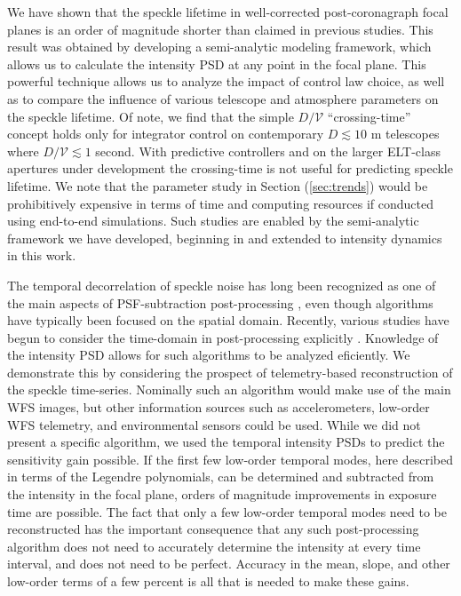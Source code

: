 \documentclass[11pt,preprint]{aastex}
\begin{document}
We have shown that the speckle lifetime in well-corrected post-coronagraph focal planes is an order of magnitude shorter than claimed in previous studies.  This result was obtained by developing a semi-analytic modeling framework, which allows us to calculate the intensity PSD at any point in the focal plane.  This powerful technique allows us to analyze the impact of control law choice, as well as to compare the influence of various telescope and atmosphere parameters on the speckle lifetime.  Of note, we find that the simple $D/\mathcal{V}$ ``crossing-time'' concept holds only for integrator control on contemporary $D\lesssim10$ m telescopes where $D/\mathcal{V} \lesssim 1$ second.  With predictive controllers and on the larger ELT-class apertures under development the crossing-time is not useful for predicting speckle lifetime.  We  note that the parameter study in Section (\ref{sec:trends}) would be prohibitively expensive in terms of time and computing resources if conducted using end-to-end simulations.  Such studies are enabled by the semi-analytic framework we have developed, beginning in \citep{2018JATIS...4a9001M} and extended to intensity dynamics in this work.

The temporal decorrelation of speckle noise has long been recognized as one of the main aspects of PSF-subtraction post-processing \citep{2006ApJ...641..556M}, even though algorithms have typically been focused on the spatial domain.  Recently, various studies have begun to consider the time-domain in post-processing explicitly \citep{2021A&A...646A..24S}.  Knowledge of the intensity PSD allows for such algorithms to be analyzed eficiently.  We demonstrate this by considering the prospect of telemetry-based reconstruction of the speckle time-series.  Nominally such an algorithm would make use of the main WFS images, but other information sources such as accelerometers, low-order WFS telemetry, and environmental sensors could be used.  While we did not present a specific algorithm, we used the temporal intensity PSDs to predict the sensitivity gain possible.  If the first few low-order temporal modes, here described in terms of the Legendre polynomials, can be determined and subtracted from the intensity in the focal plane, orders of magnitude improvements in exposure time are possible.  The fact that only a few low-order temporal modes need to be reconstructed has the important consequence that any such post-processing algorithm does not need to accurately determine the intensity at every time interval, and does not need to be perfect.  Accuracy in the mean, slope, and other low-order terms of a few percent is all that is needed to make these gains.
\end{document}
